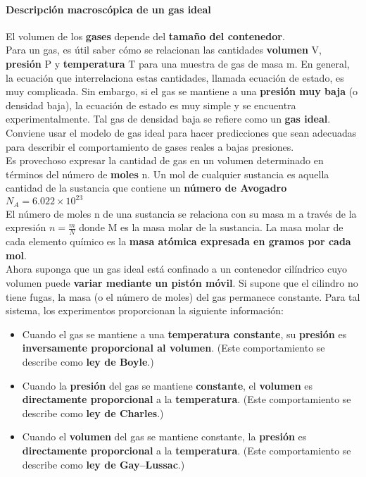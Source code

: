 \documentclass[10pt]{article}
\begin{document}
\paragraph{Descripción macroscópica de un gas ideal}
El volumen de los \textbf{gases} depende del \textbf{tamaño del contenedor}.\\
Para un gas, es útil saber cómo se relacionan las cantidades \textbf{volumen} V, \textbf{presión} P y \textbf{temperatura} T para una muestra de gas de masa m. En general, la ecuación que interrelaciona estas cantidades, llamada ecuación de estado, es muy complicada. Sin embargo, si el gas se mantiene a una \textbf{presión muy baja} (o densidad baja), la ecuación de estado es muy simple y se encuentra experimentalmente. Tal gas de densidad baja se refiere como un \textbf{gas ideal}. Conviene usar el modelo de gas ideal para hacer predicciones que sean adecuadas para describir el comportamiento de gases reales a bajas presiones.\\
Es provechoso expresar la cantidad de gas en un volumen determinado en términos del número de \textbf{moles} n. Un mol de cualquier sustancia es aquella cantidad de la sustancia que contiene un \textbf{número de Avogadro} $N_A = 6.022 \times 10^{23}$\\
El número de moles n de una sustancia se relaciona con su masa m a través de la expresión $n = \frac{m}{N}$ donde M es la masa molar de la sustancia. La masa molar de cada elemento químico es la \textbf{masa atómica  expresada en gramos por cada mol}.\\
Ahora suponga que un gas ideal está confinado a un contenedor cilíndrico cuyo volumen puede \textbf{variar mediante un pistón móvil}. Si supone que el cilindro no tiene fugas, la masa (o el número de moles) del gas permanece constante. Para tal sistema, los experimentos proporcionan la siguiente información:
\begin{itemize}
	\item  Cuando el gas se mantiene a una \textbf{temperatura constante}, su \textbf{presión} es \textbf{inversamente
proporcional al volumen}. (Este comportamiento se describe como \textbf{ley de Boyle}.)
	\item Cuando la \textbf{presión} del gas se mantiene \textbf{constante}, el \textbf{volumen} es \textbf{directamente proporcional} a la \textbf{temperatura}. (Este comportamiento se describe como \textbf{ley de Charles}.)
	\item Cuando el \textbf{volumen} del gas se mantiene constante, la \textbf{presión} es \textbf{directamente proporcional} a la \textbf{temperatura}. (Este comportamiento se describe como \textbf{ley de Gay–Lussac}.)
\end{itemize}
\end{document}
